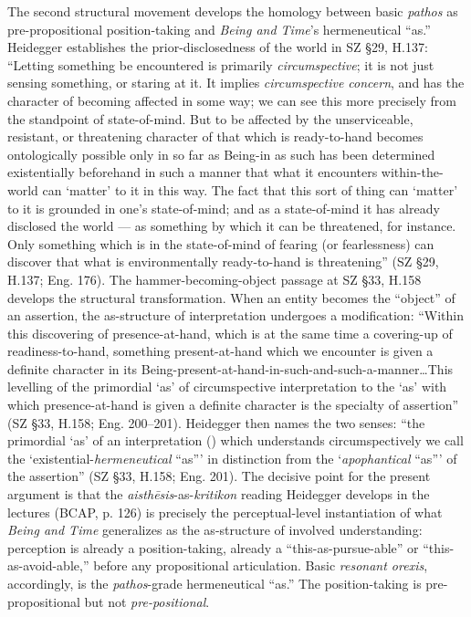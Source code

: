 The second structural movement develops the homology between basic \textit{pathos} as pre-propositional position-taking and \textit{Being and Time}'s hermeneutical ``as.'' Heidegger establishes the prior-disclosedness of the world in SZ \S29, H.137: ``Letting something be encountered is primarily \textit{circumspective}; it is not just sensing something, or staring at it. It implies \textit{circumspective concern}, and has the character of becoming affected in some way; we can see this more precisely from the standpoint of state-of-mind. But to be affected by the unserviceable, resistant, or threatening character of that which is ready-to-hand becomes ontologically possible only in so far as Being-in as such has been determined existentially beforehand in such a manner that what it encounters within-the-world can `matter' to it in this way. The fact that this sort of thing can `matter' to it is grounded in one's state-of-mind; and as a state-of-mind it has already disclosed the world --- as something by which it can be threatened, for instance. Only something which is in the state-of-mind of fearing (or fearlessness) can discover that what is environmentally ready-to-hand is threatening'' (SZ \S29, H.137; Eng. 176). The hammer-becoming-object passage at SZ \S33, H.158 develops the structural transformation. When an entity becomes the ``object'' of an assertion, the as-structure of interpretation undergoes a modification: ``Within this discovering of presence-at-hand, which is at the same time a covering-up of readiness-to-hand, something present-at-hand which we encounter is given a definite character in its Being-present-at-hand-in-such-and-such-a-manner\dots This levelling of the primordial `as' of circumspective interpretation to the `as' with which presence-at-hand is given a definite character is the specialty of assertion'' (SZ \S33, H.158; Eng. 200--201). Heidegger then names the two senses: ``the primordial `as' of an interpretation () which understands circumspectively we call the `existential-\textit{hermeneutical} ``as''' in distinction from the `\textit{apophantical} ``as''' of the assertion'' (SZ \S33, H.158; Eng. 201). The decisive point for the present argument is that the \textit{aisthēsis}-as-\textit{kritikon} reading Heidegger develops in the lectures (BCAP, p. 126) is precisely the perceptual-level instantiation of what \textit{Being and Time} generalizes as the as-structure of involved understanding: perception is already a position-taking, already a ``this-as-pursue-able'' or ``this-as-avoid-able,'' before any propositional articulation. Basic \textit{resonant orexis}, accordingly, is the \textit{pathos}-grade hermeneutical ``as.'' The position-taking is pre-propositional but not \textit{pre-positional}.

